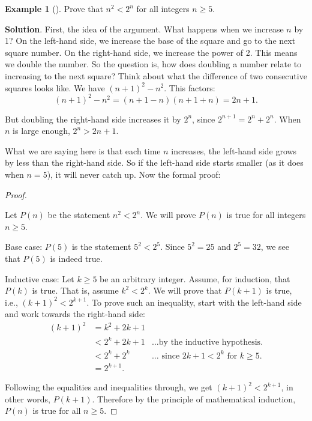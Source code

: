 \documentclass[10pt,]{book}
\theoremstyle{plain}
\theoremstyle{definition}
\theoremstyle{definition}
\newtheorem{example}[theorem]{Example}
\theoremstyle{definition}
\theoremstyle{definition}
\numberwithin{equation}{chapter}
\newcommand{\lt}{<}
\newcommand{\amp}{&}
\begin{document}
\begin{example}[]\label{example-76}
\hypertarget{p-2136}{}%
Prove that \(n^2 \lt  2^n\) for all integers \(n \ge 5\).%
\par\smallskip%
\noindent\textbf{Solution}.\hypertarget{solution-198}{}\quad%
\hypertarget{p-2137}{}%
First, the idea of the argument. What happens when we increase \(n\) by 1? On the left-hand side, we increase the base of the square and go to the next square number. On the right-hand side, we increase the power of 2. This means we double the number. So the question is, how does doubling a number relate to increasing to the next square? Think about what the difference of two consecutive squares looks like. We have \((n+1)^2 - n^2\). This factors:%
\begin{equation*}
(n+1)^2 - n^2 = (n+1-n)(n+1+n) = 2n+1.
\end{equation*}
%
\par
\hypertarget{p-2138}{}%
But doubling the right-hand side increases it by \(2^n\), since \(2^{n+1} = 2^n + 2^n\). When \(n\) is large enough, \(2^n > 2n + 1\).%
\par
\hypertarget{p-2139}{}%
What we are saying here is that each time \(n\) increases, the left-hand side grows by less than the right-hand side. So if the left-hand side starts smaller (as it does when \(n = 5\)), it will never catch up. Now the formal proof:%
\begin{proof}\hypertarget{proof-40}{}
\hypertarget{p-2140}{}%
Let \(P(n)\) be the statement \(n^2 \lt  2^n\). We will prove \(P(n)\) is true for all integers \(n \ge 5\).%
\par
\hypertarget{p-2141}{}%
Base case: \(P(5)\) is the statement \(5^2 \lt  2^5\). Since \(5^2 = 25\) and \(2^5 = 32\), we see that \(P(5)\) is indeed true.%
\par
\hypertarget{p-2142}{}%
Inductive case: Let \(k \ge 5\) be an arbitrary integer. Assume, for induction, that \(P(k)\) is true. That is, assume \(k^2 \lt  2^k\). We will prove that \(P(k+1)\) is true, i.e., \((k+1)^2 \lt  2^{k+1}\). To prove such an inequality, start with the left-hand side and work towards the right-hand side:%
\begin{align*}
(k+1)^2 \amp = k^2 + 2k + 1 \amp\\
\amp \lt 2^k + 2k + 1 \amp \ldots\text{by the inductive hypothesis.}\\
\amp \lt 2^k + 2^k \amp \ldots\text{ since } 2k + 1 \lt  2^k \text{ for }k \ge 5.\\
\amp = 2^{k+1}. \amp
\end{align*}
%
\par
\hypertarget{p-2143}{}%
Following the equalities and inequalities through, we get \((k+1)^2 \lt  2^{k+1}\), in other words, \(P(k+1)\). Therefore by the principle of mathematical induction, \(P(n)\) is true for all \(n \ge 5\).%
\end{proof}
\end{example}
\end{document}
